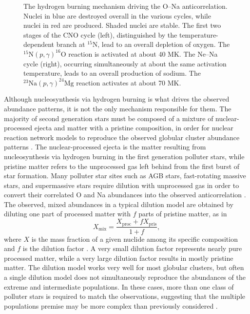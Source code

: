 \begin{figure}[t]
\begin{minipage}{.44\linewidth}
\begin{tikzpicture}[scale=1.5, every node/.style={transform shape}]
\end{tikzpicture}
\end{minipage}
\vspace{0.75 cm}
\caption{\label{fig:CNO_NeNa}The hydrogen burning mechanism driving the O--Na anticorrelation. Nuclei in blue are destroyed overall in the various cycles, while nuclei in red are produced. Shaded nuclei are stable. The first two stages of the CNO cycle (left), distinguished by the temperature-dependent branch at $^{15}$N, lead to an overall depletion of oxygen. The $^{15}\mathrm{N}(p, \gamma)^{16}\mathrm{O}$ reaction is activated at about 40 MK. The Ne--Na cycle (right), occurring simultaneously at about the same activation temperature, leads to an overall production of sodium. The $^{23}\mathrm{Na}(p,\gamma)^{24}\mathrm{Mg}$ reaction activates at about 70 MK.}
\end{figure}


Although nucleosynthesis via hydrogen burning is what drives the observed abundance patterns, it is not the only mechanism responsible for them. The majority of second generation stars must be composed of a mixture of nuclear-processed ejecta and matter with a pristine composition, in order for nuclear reaction network models to reproduce the observed globular cluster abundance patterns \cite{Prantzos2007}. The nuclear-processed ejecta is the matter resulting from nucleosynthesis via hydrogen burning in the first generation polluter stars, while pristine matter refers to the unprocessed gas left behind from the first burst of star formation. Many polluter star sites such as AGB stars, fast-rotating massive stars, and supermassive stars require dilution with unprocessed gas in order to convert their correlated O and Na abundances into the observed anticorrelation \cite{DErcole2010,DErcole2011,DErcole2012}. The observed, mixed abundances in a typical dilution model are obtained by diluting one part of processed matter with $f$ parts of pristine matter, as in
\begin{equation}
X_{\mathrm{mix}} = \frac{X_{\mathrm{proc}} + f X_{\mathrm{pris}}}{1 + f},
\end{equation}
where $X$ is the mass fraction of a given nuclide among its specific composition and $f$ is the dilution factor \cite{Prantzos2007,Carretta2009}. A very small dilution factor represents nearly pure processed matter, while a very large dilution factor results in mostly pristine matter. The dilution model works very well for most globular clusters, but often a single dilution model does not simultaneously reproduce the abundances of the extreme and intermediate populations. In these cases, more than one class of polluter stars is required to match the observations, suggesting that the multiple populations premise may be more complex than previously considered \cite{Gratton2019}.

